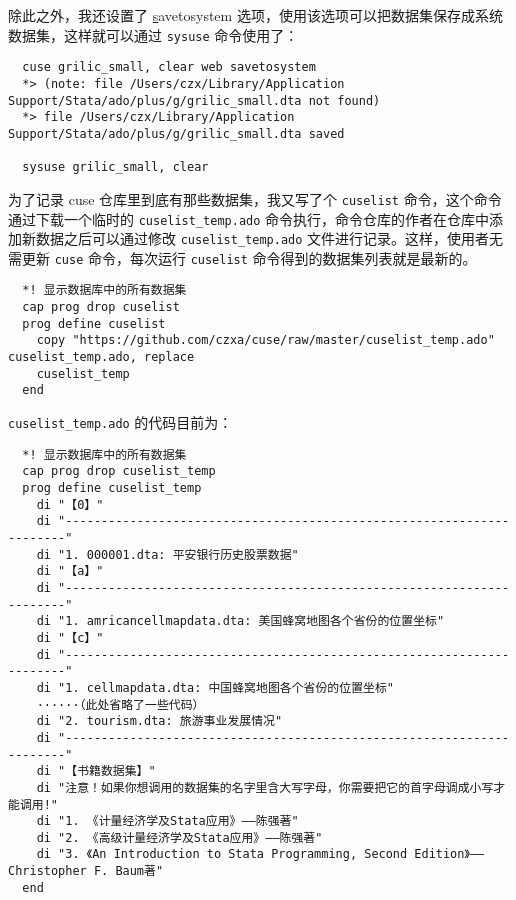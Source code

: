 \documentclass[lang=cn,11pt]{elegantpaper}
\begin{document}
除此之外，我还设置了 \underline{s}avetosystem 选项，使用该选项可以把数据集保存成系统数据集，这样就可以通过 \lstinline{sysuse} 命令使用了：

\begin{lstlisting}
  cuse grilic_small, clear web savetosystem
  *> (note: file /Users/czx/Library/Application Support/Stata/ado/plus/g/grilic_small.dta not found)
  *> file /Users/czx/Library/Application Support/Stata/ado/plus/g/grilic_small.dta saved

  sysuse grilic_small, clear
\end{lstlisting}

为了记录 cuse 仓库里到底有那些数据集，我又写了个 \lstinline{cuselist} 命令，这个命令通过下载一个临时的 \lstinline{cuselist_temp.ado} 命令执行，命令仓库的作者在仓库中添加新数据之后可以通过修改 \lstinline{cuselist_temp.ado} 文件进行记录。这样，使用者无需更新 \lstinline{cuse}  命令，每次运行 \lstinline{cuselist} 命令得到的数据集列表就是最新的。

\begin{lstlisting}
  *! 显示数据库中的所有数据集
  cap prog drop cuselist
  prog define cuselist
  	copy "https://github.com/czxa/cuse/raw/master/cuselist_temp.ado" cuselist_temp.ado, replace
  	cuselist_temp
  end
\end{lstlisting}

\lstinline{cuselist_temp.ado} 的代码目前为：

\begin{lstlisting}
  *! 显示数据库中的所有数据集
  cap prog drop cuselist_temp
  prog define cuselist_temp
  	di "【0】"
  	di "----------------------------------------------------------------------"
  	di "1. 000001.dta: 平安银行历史股票数据"
  	di "【a】"
  	di "----------------------------------------------------------------------"
  	di "1. amricancellmapdata.dta: 美国蜂窝地图各个省份的位置坐标"
  	di "【c】"
  	di "----------------------------------------------------------------------"
  	di "1. cellmapdata.dta: 中国蜂窝地图各个省份的位置坐标"
    ······（此处省略了一些代码）
  	di "2. tourism.dta: 旅游事业发展情况"
  	di "----------------------------------------------------------------------"
  	di "【书籍数据集】"
  	di "注意！如果你想调用的数据集的名字里含大写字母，你需要把它的首字母调成小写才能调用!"
  	di "1. 《计量经济学及Stata应用》——陈强著"
  	di "2. 《高级计量经济学及Stata应用》——陈强著"
  	di "3. 《An Introduction to Stata Programming, Second Edition》——Christopher F. Baum著"
  end
\end{lstlisting}
\end{document}
